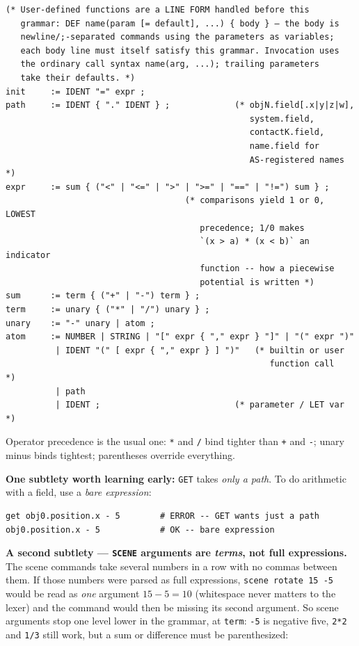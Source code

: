 \documentclass[11pt]{article}
\newcommand{\kw}[1]{\texttt{\uppercase{#1}}}
\newcommand{\code}[1]{\texttt{#1}}
\begin{document}
\begin{lstlisting}
(* User-defined functions are a LINE FORM handled before this
   grammar: DEF name(param [= default], ...) { body } — the body is
   newline/;-separated commands using the parameters as variables;
   each body line must itself satisfy this grammar. Invocation uses
   the ordinary call syntax name(arg, ...); trailing parameters
   take their defaults. *)
init     := IDENT "=" expr ;
path     := IDENT { "." IDENT } ;             (* objN.field[.x|y|z|w],
                                                 system.field,
                                                 contactK.field,
                                                 name.field for
                                                 AS-registered names *)
expr     := sum { ("<" | "<=" | ">" | ">=" | "==" | "!=") sum } ;
                                    (* comparisons yield 1 or 0, LOWEST
                                       precedence; 1/0 makes
                                       `(x > a) * (x < b)` an indicator
                                       function -- how a piecewise
                                       potential is written *)
sum      := term { ("+" | "-") term } ;
term     := unary { ("*" | "/") unary } ;
unary    := "-" unary | atom ;
atom     := NUMBER | STRING | "[" expr { "," expr } "]" | "(" expr ")"
          | IDENT "(" [ expr { "," expr } ] ")"   (* builtin or user
                                                     function call   *)
          | path
          | IDENT ;                           (* parameter / LET var *)
\end{lstlisting}

Operator precedence is the usual one: \code{*} and \code{/} bind tighter
than \code{+} and \code{-}; unary minus binds tightest; parentheses
override everything.

\textbf{One subtlety worth learning early:} \kw{get} takes \emph{only a
path}. To do arithmetic with a field, use a \emph{bare expression}:
\begin{lstlisting}
get obj0.position.x - 5        # ERROR -- GET wants just a path
obj0.position.x - 5            # OK -- bare expression
\end{lstlisting}

\textbf{A second subtlety --- \kw{scene} arguments are \emph{terms},
not full expressions.} The scene commands take several numbers in a row
with no commas between them. If those numbers were parsed as full
expressions, \code{scene rotate 15 -5} would be read as \emph{one}
argument $15-5=10$ (whitespace never matters to the lexer) and the
command would then be missing its second argument. So scene arguments
stop one level lower in the grammar, at \code{term}: \code{-5} is
negative five, \code{2*2} and \code{1/3} still work, but a sum or
difference must be parenthesized:
\end{document}
